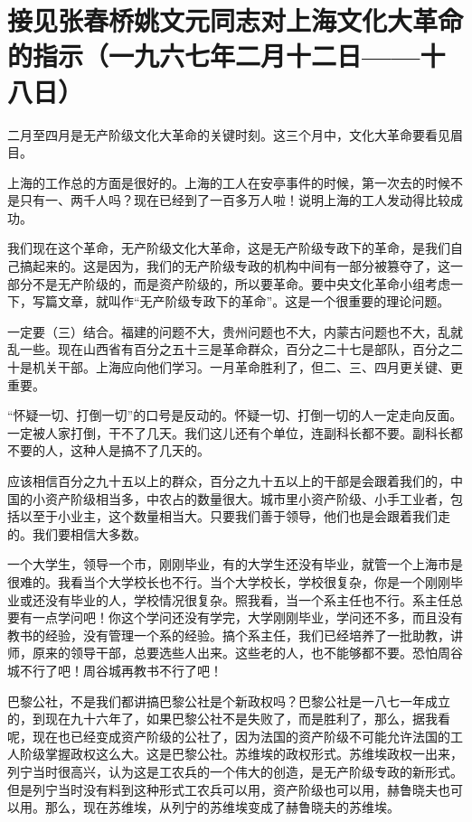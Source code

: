 \section[接见张春桥姚文元同志对上海文化大革命的指示（一九六七年二月十二日——十八日）]{接见张春桥姚文元同志对上海文化大革命的指示（一九六七年二月十二日——十八日）}


二月至四月是无产阶级文化大革命的关键时刻。这三个月中，文化大革命要看见眉目。

上海的工作总的方面是很好的。上海的工人在安亭事件的时候，第一次去的时候不是只有一、两千人吗？现在已经到了一百多万人啦！说明上海的工人发动得比较成功。

我们现在这个革命，无产阶级文化大革命，这是无产阶级专政下的革命，是我们自己搞起来的。这是因为，我们的无产阶级专政的机构中间有一部分被篡夺了，这一部分不是无产阶级的，而是资产阶级的，所以要革命。要中央文化革命小组考虑一下，写篇文章，就叫作“无产阶级专政下的革命”。这是一个很重要的理论问题。

一定要（三）结合。福建的问题不大，贵州问题也不大，内蒙古问题也不大，乱就乱一些。现在山西省有百分之五十三是革命群众，百分之二十七是部队，百分之二十是机关干部。上海应向他们学习。一月革命胜利了，但二、三、四月更关键、更重要。

“怀疑一切、打倒一切”的口号是反动的。怀疑一切、打倒一切的人一定走向反面。一定被人家打倒，干不了几天。我们这儿还有个单位，连副科长都不要。副科长都不要的人，这种人是搞不了几天的。

应该相信百分之九十五以上的群众，百分之九十五以上的干部是会跟着我们的，中国的小资产阶级相当多，中农占的数量很大。城市里小资产阶级、小手工业者，包括以至于小业主，这个数量相当大。只要我们善于领导，他们也是会跟着我们走的。我们要相信大多数。

一个大学生，领导一个市，刚刚毕业，有的大学生还没有毕业，就管一个上海市是很难的。我看当个大学校长也不行。当个大学校长，学校很复杂，你是一个刚刚毕业或还没有毕业的人，学校情况很复杂。照我看，当一个系主任也不行。系主任总要有一点学问吧！你这个学问还没有学完，大学刚刚毕业，学问还不多，而且没有教书的经验，没有管理一个系的经验。搞个系主任，我们已经培养了一批助教，讲师，原来的领导干部，总要选些人出来。这些老的人，也不能够都不要。恐怕周谷城不行了吧！周谷城再教书不行了吧！

巴黎公社，不是我们都讲搞巴黎公社是个新政权吗？巴黎公社是一八七一年成立的，到现在九十六年了，如果巴黎公社不是失败了，而是胜利了，那么，据我看呢，现在也已经变成资产阶级的公社了，因为法国的资产阶级不可能允许法国的工人阶级掌握政权这么大。这是巴黎公社。苏维埃的政权形式。苏维埃政权一出来，列宁当时很高兴，认为这是工农兵的一个伟大的创造，是无产阶级专政的新形式。但是列宁当时没有料到这种形式工农兵可以用，资产阶级也可以用，赫鲁晓夫也可以用。那么，现在苏维埃，从列宁的苏维埃变成了赫鲁晓夫的苏维埃。

